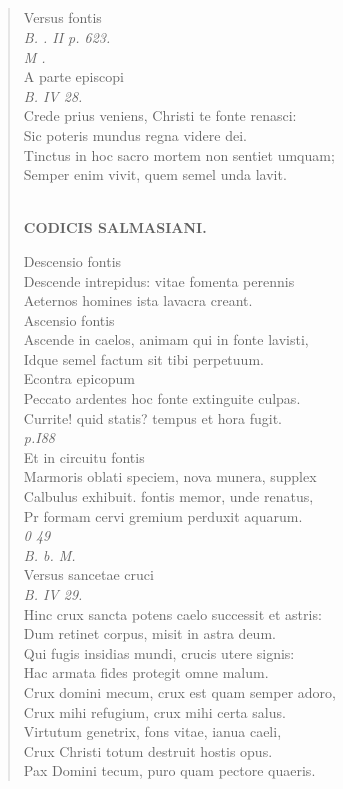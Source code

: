 \documentclass[11pt, a4paper]{report}
\begin{document}
            \subsection*{}
      \begin{verse}
      Versus fontis \\ \textit{B. . II p. 623.} \\ \textit{M .} \\ A parte episcopi \\ \textit{B. IV 28.} \\ Crede prius veniens, Christi te fonte renasci: \\ Sic poteris mundus regna videre dei. \\ Tinctus in hoc sacro mortem non sentiet umquam; \\ Semper enim vivit, quem semel unda lavit. \\ 
        ﻿\pagebreak 
    \begin{center} \textbf{CODICIS SALMASIANI.} \end{center} \marginpar{[291]} Descensio fontis \\ Descende intrepidus: vitae fomenta perennis \\ Aeternos homines ista lavacra creant. \\ Ascensio fontis \\ Ascende in caelos, animam qui in fonte lavisti, \\ Idque semel factum sit tibi perpetuum. \\ Econtra epicopum \\ Peccato ardentes hoc fonte extinguite culpas. \\ Currite! quid statis? tempus et hora fugit. \\ \textit{p.I88} \\ Et in circuitu fontis \\ Marmoris oblati speciem, nova munera, supplex \\ Calbulus exhibuit. fontis memor, unde renatus, \\ Pr formam cervi gremium perduxit aquarum. \\ \textit{0 49} \\ \textit{B. b. M.} \\ Versus sancetae cruci \\ \textit{B. IV 29.} \\ Hinc crux sancta potens caelo successit et astris: \\ Dum retinet corpus, misit in astra deum. \\ Qui fugis insidias mundi, crucis utere signis: \\ Hac armata fides protegit omne malum. \\ Crux domini mecum, crux est quam semper adoro, \\ Crux mihi refugium, crux mihi certa salus. \\ Virtutum genetrix, fons vitae, ianua caeli, \\ Crux Christi totum destruit hostis opus. \\ Pax Domini tecum, puro quam pectore quaeris. \\ 

\end{verse}
\end{document}

